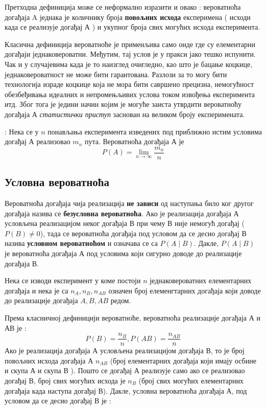 Претходна дефиниција може се неформално изразити и овако : вероватноћа догађаја A једнака је количнику броја \textbf{повољних исхода} експеримена ( исходи када се реализује догађај А ) и укупног броја свих могућих исхода експеримента.

Класична дефиниција вероватноће је применљива само онде где су елементарни догађаји једнаковероватни. Међутим, тај услов је у пракси јако тешко испунити. Чак и у случајевима када је то наизглед очигледно, као што је бацање коцкице, једнаковероватност не може бити гарантована.  Разлози за то могу бити технологија израде коцкице која не мора бити савршено прецизна, немогућност обезбеђивања идеалних и непромењљивих услова током извођења експеримента итд. Због тога је једини начин којим је могуће заиста утврдити вероватноћу догађаја А \textit{статистички приступ} заснован на великом броју експеримената.




\begin{de}
 : 
Нека се  у $n$ понављања експеримента изведених под приближно истим условима догађај А реализовао ${m_n}$ пута. Вероватноћа догађаја А је
\begin{equation}
 P(A) = \lim_{n\to\infty}\frac{m_n}{n} 
\end{equation}
\end{de}

\subsection{Условна вероватноћа}

Вероватноћа догађаја чија реализација \textbf{не зависи} од наступања било ког другог догађаја назива се \textbf{безусловна вероватноћа}. Ако је реализација догађаја А условљена реализацијом неког догађаја В при чему В није немогућ догађај ( $ P(B) \neq 0 $), тада се вероватноћа догађаја под условом да се десио догађај В назива \textbf{условном вероватноћом} и означава се са 
$ P(A \mid B )$. Дакле, $ P(A \mid B )$ је вероватноћа догађаја А под условима који сигурно доводе до реализације догађаја В.

Нека се изводи експеримент у коме постоји $n$ једнаковероватних елементарних догађаја и нека је са $n_A,n_B,n_{AB}$ означен број елеменгтарних догађаја који доводе до реализације догађаја $A, B ,AB$ редом. 

Према класничној дефиницији вероватноће, вероватноћа реализације догађаја А и АВ је :
\begin{equation}
P(B) = \frac{n_B}{n}, P(AB) = \frac{n_{AB}}{n}
\end{equation}
Ако је реализација догађаја А условљена реализацијом догађаја В, то је број повољних исхода догађаја А $n_{AB}$ (број елементарних догађаја који имају осбине и скупа А и скупа В ). Пошто се догађај А реализује само ако се реализовао догађај В, број свих могућих исхода је $n_B$ (број свих могућих елементарних догађаја када наступа догађај В). Дакле, условна вероватноћа догађаја А, под условом да се десио догађај В је :

